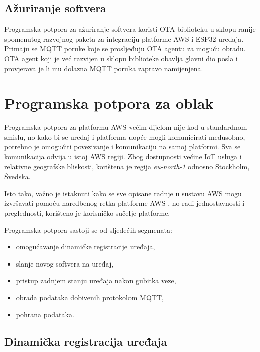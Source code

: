 \subsection{Ažuriranje softvera}

Programska potpora za ažuriranje softvera koristi OTA biblioteku u sklopu ranije spomenutog razvojnog paketa za integraciju platforme AWS i ESP32 uređaja. Primaju se MQTT poruke koje se prosljeđuju OTA agentu za moguću obradu. OTA agent koji je već razvijen u sklopu biblioteke obavlja glavni dio posla i provjerava je li mu dolazna MQTT poruka zapravo namijenjena. 

\section{Programska potpora za oblak}

Programska potpora za platformu AWS većim dijelom nije kod u standardnom smislu, no kako bi se uređaj i platforma uopće mogli komunicirati međusobno, potrebno je omogućiti povezivanje i komunikaciju na samoj platformi. Sva se komunikacija odvija u istoj AWS regiji. Zbog dostupnosti većine IoT usluga i relativne geografske bliskosti, korištena je regija \textit{eu-north-1} odnosno Stockholm, Švedska. 

Isto tako, važno je istaknuti kako se sve opisane radnje u sustavu AWS mogu izvršavati pomoću naredbenog retka platforme AWS , no radi jednostavnosti i preglednosti, korišteno je korisničko sučelje platforme.

Programska potpora sastoji se od sljedećih segmenata:
\begin{itemize}
	\item omogućavanje dinamičke registracije uređaja,
	\item slanje novog softvera na uređaj,
	\item pristup zadnjem stanju uređaja nakon gubitka veze,
	\item obrada podataka dobivenih protokolom MQTT,
	\item pohrana podataka.
\end{itemize}

\subsection{Dinamička registracija uređaja}

